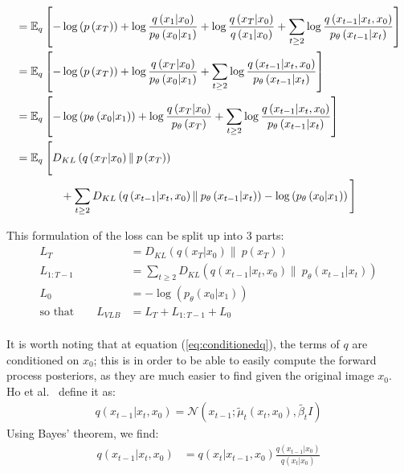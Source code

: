 \documentclass[twoside]{article}
\numberwithin{equation}{section}
\numberwithin{figure}{section}
\begin{document}
\begin{align}
  &= \mathbb{E}_q \left[-\log\left(p \left(x_T\right)\right) + \log \frac{q\left(x_1 | x_0\right)}{p_{\theta}\left(x_0 | x_1\right)} + \log \frac{q\left(x_T | x_0\right)}{q\left(x_1 | x_0\right)} + \sum_{t \geq 2} \log \frac{q\left(x_{t-1} | x_t, x_0\right)}{p_{\theta}\left(x_{t-1} | x_t\right)}\right] \\
  &= \mathbb{E}_q \left[-\log\left(p \left(x_T\right)\right) + \log \frac{q\left(x_T | x_0\right)}{p_{\theta}\left(x_0 | x_1\right)} + \sum_{t \geq 2} \log \frac{q\left(x_{t-1} | x_t, x_0\right)}{p_{\theta}\left(x_{t-1} | x_t\right)}\right] \\
  &= \mathbb{E}_q \left[- \log\left(p_{\theta}\left(x_0 | x_1\right)\right) + \log \frac{q\left(x_T | x_0\right)}{p_{\theta}\left(x_T\right)} + \sum_{t \geq 2} \log \frac{q\left(x_{t-1} | x_t, x_0\right)}{p_{\theta}\left(x_{t-1} | x_t\right)}\right] \\
  &= \mathbb{E}_q \: \Bigg[ D_{KL}\left(q\left(x_T | x_0\right) \| \: p\left(x_T\right)\right) \Bigg.  \\
  &\qquad \qquad \Bigg. + \sum_{t \geq 2} D_{KL}\left(q\left(x_{t-1} | x_t, x_0\right) \| \: p_{\theta}\left(x_{t-1} | x_t\right)\right) - \log\left(p_{\theta}\left(x_0 | x_1\right)\right) \Bigg] \notag
\end{align}

This formulation of the loss can be split up into 3 parts:
\begin{align}
  L_T &= D_{KL}\left(q\left(x_T | x_0\right) \| \: p\left(x_T\right)\right) \label{eq:lT}\\
  L_{1:T-1} &= \sum_{t \geq 2} D_{KL}\left(q\left(x_{t-1} | x_t, x_0\right) \| \: p_{\theta}\left(x_{t-1} | x_t\right)\right) \\
  L_0 &=  - \log\left(p_{\theta}\left(x_0 | x_1\right)\right) \\
  \text{so that} \qquad L_{VLB} &= L_T + L_{1:T-1} + L_0
\end{align}
\\
It is worth noting that at equation (\ref{eq:conditionedq}), the terms of $q$ are conditioned on $x_0$; this is in order to be able to easily compute the forward process posteriors, as they are much easier to find given the original image $x_0$. \\
Ho et al.~\cite{ho2020denoising} define it as:
\begin{gather}
  q\left(x_{t-1} | x_t, x_0\right) = \mathcal{N}\left(x_{t-1}; \tilde{\mu}_t \left(x_t, x_0\right), \tilde{\beta_t} I\right)
\end{gather}
Using Bayes' theorem, we find:
\begin{align}
  q\left(x_{t-1} | x_t, x_0\right) &= q\left(x_t | x_{t-1}, x_0\right) \frac{q\left(x_{t-1}| x_0\right)}{q\left(x_t | x_0\right)} \label{eq:ddpmbayes}
\end{align}
\end{document}
